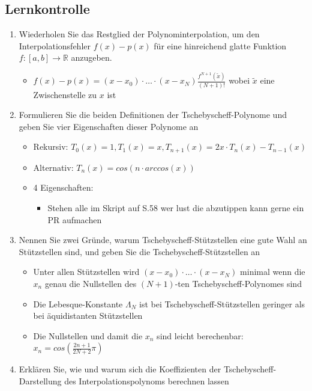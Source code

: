 \documentclass[]{article}
\begin{document}
\subsection{Lernkontrolle}
	\begin{enumerate}
		\item Wiederholen Sie das Restglied der Polynominterpolation, um den Interpolationsfehler $f(x)-p(x)$ für eine hinreichend glatte Funktion $f: [a,b]\rightarrow \mathbb{R}$ anzugeben. 
			\begin{itemize}
				\item $f(x) - p(x) = (x-x_0) \cdot \dots \cdot (x-x_{N}) \frac{f^{N+1}(\tilde{x})}{(N+1)!}$ wobei $\tilde{x}$ eine Zwischenstelle zu $x$ ist
			\end{itemize}
		\item Formulieren Sie die beiden Definitionen der Tschebyscheff-Polynome und geben Sie vier Eigenschaften dieser Polynome an
			\begin{itemize}
				\item Rekursiv: $T_0(x) = 1, T_1(x) = x, T_{n+1}(x) = 2x \cdot T_n(x) - T_{n-1}(x)$
				\item Alternativ: $T_n(x) = cos(n \cdot arccos(x))$
				\item 4 Eigenschaften:
				\begin{itemize}
					\item Stehen alle im Skript auf S.58 wer lust die abzutippen kann gerne ein PR aufmachen %
				\end{itemize}
			\end{itemize}
		\item Nennen Sie zwei Gründe, warum Tschebyscheff-Stützstellen eine gute Wahl an Stützstellen sind, und geben Sie die Tschebyscheff-Stützstellen an
			\begin{itemize}
				\item Unter allen Stützstellen wird $(x-x_0) \cdot \dots \cdot (x-x_{N})$ minimal wenn die $x_n$ genau die Nullstellen des $(N+1)$-ten Tschebyscheff-Polynomes sind
				\item Die Lebesque-Konstante $\Lambda_N$ ist bei Tschebyscheff-Stützstellen geringer als bei äquidistanten Stützstellen
				\item Die Nullstellen und damit die $x_n$ sind leicht berechenbar: $x_n = cos(\frac{2n+1}{2N+2} \pi)$
			\end{itemize}
		\item Erklären Sie, wie und warum sich die Koeffizienten der Tschebyscheff-Darstellung des Interpolationspolynoms berechnen lassen

\end{enumerate}
\end{document}
